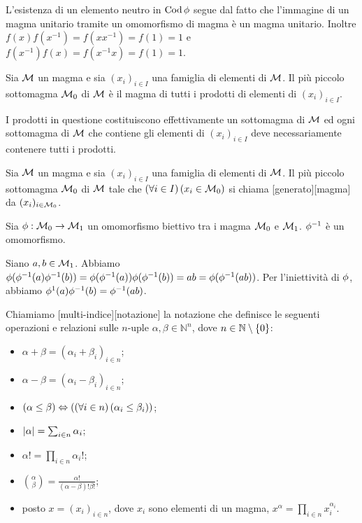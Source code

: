 \Proof L'esistenza di un elemento neutro in $\operatorname{Cod}{\phi}$ segue dal fatto che l'immagine di un magma unitario tramite un omomorfismo di magma \`e un magma unitario. Inoltre $f(x)f(x^{-1}) = f(xx^{-1}) = f(1) = 1$ e $f(x^{-1})f(x) = f(x^{-1}x) = f(1) = 1$. \EndProof
\begin{Theorem}
	Sia $\mathcal{M}$ un magma e sia $(x_i)_{i \in I}$ una famiglia di
	elementi di $\mathcal{M}$. Il pi\`u piccolo sottomagma $\mathcal{M}_0$ di
	$\mathcal{M}$ \`e il magma di tutti i prodotti di elementi di
	$(x_i)_{i \in I}$.
\end{Theorem}
\Proof I prodotti in questione costituiscono effettivamente un sottomagma
di $\mathcal{M}$ ed ogni sottomagma di $\mathcal{M}$ che contiene gli elementi di
$(x_i)_{i \in I}$ deve necessariamente contenere tutti i prodotti.
\EndProof
\begin{Definition}
	Sia $\mathcal{M}$ un magma e sia $(x_i)_{i \in I}$ una famiglia di
	elementi di $\mathcal{M}$. Il pi\`u piccolo sottomagma $\mathcal{M}_0$ di
	$\mathcal{M}$ tale che $\left ( \forall i \in I \right ) \left ( x_i \in \mathcal{M}_0 \right )$ si chiama
	[generato][magma] da
	$(x_i)_{i \in \mathcal{M}_0}$.
\end{Definition}
\begin{Theorem}
	Sia $\phi: \mathcal{M}_0 \rightarrow \mathcal{M}_1$ un omomorfismo
	biettivo tra i magma $\mathcal{M}_0$ e $\mathcal{M}_1$. $\phi^{-1}$
	\`e un omomorfismo.
\end{Theorem}
\Proof Siano $a, b \in \mathcal{M}_1$. Abbiamo
$\phi(\phi^{-1}(a)\phi^{-1}(b)) =
\phi(\phi^{-1}(a))\phi(\phi^{-1}(b)) =
ab =
\phi(\phi^{-1}(ab))$.
Per l'iniettivit\`a di $\phi$, abbiamo
$\phi^{1}(a)\phi^{-1}(b) = \phi^{-1}(ab)$.
\EndProof
\begin{Definition}
	Chiamiamo [multi-indice][notazione] la notazione che definisce le seguenti operazioni e relazioni sulle $n$-uple $\alpha, \beta \in \mathbb{N}^n$, dove $n \in \mathbb{N} \setminus \lbrace 0 \rbrace$:
	\begin{itemize}
		\item $\alpha + \beta = (\alpha_i + \beta_i)_{i \in n}$;
		\item $\alpha - \beta = (\alpha_i - \beta_i)_{i \in n}$;
		\item $\left ( \alpha \leq \beta \right ) \Leftrightarrow \left ( \left ( \forall i \in n \right ) \left ( \alpha_i \leq \beta_i \right ) \right )$;
		\item $\left \lvert \alpha \right \rvert = \sum_{i \in n} \alpha_i$;
		\item $\alpha! = \prod_{i \in n}\alpha_i!$;
		\item $\binom{\alpha}{\beta} = \frac{\alpha!}{(\alpha - \beta)!\beta!}$;
		\item posto $x = (x_i)_{i \in n}$, dove $x_i$ sono elementi di un magma, $x^\alpha = \prod_{i \in n} x_i^{\alpha_i}$.
	\end{itemize}
\end{Definition}
